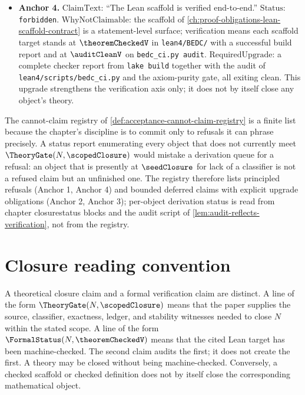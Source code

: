 \begin{remark}
\begin{itemize}
  \item \textbf{Anchor 4.} $\mathrm{ClaimText}$: ``The Lean scaffold is verified end-to-end.'' $\mathrm{Status}$: \texttt{forbidden}. $\mathrm{WhyNotClaimable}$: the scaffold of \autoref{ch:proof-obligations-lean-scaffold-contract} is a statement-level surface; verification means each scaffold target stands at $\theoremCheckedV$ in \texttt{lean4/BEDC/} with a successful build report and at $\auditCleanV$ on \texttt{bedc\_ci.py audit}. $\mathrm{RequiredUpgrade}$: a complete checker report from \texttt{lake build} together with the audit of \texttt{lean4/scripts/bedc\_ci.py} and the axiom-purity gate, all exiting clean. This upgrade strengthens the verification axis only; it does not by itself close any object's theory.
\end{itemize}
\end{remark}

\begin{remark}
\label{rem:acceptance-registry-finite}
The cannot-claim registry of \autoref{def:acceptance-cannot-claim-registry} is a finite list because the chapter's discipline is to commit only to refusals it can phrase precisely. A status report enumerating every object that does not currently meet $\TheoryGate(N, \scopedClosure)$ would mistake a derivation queue for a refusal: an object that is presently at $\seedClosure$ for lack of a classifier is not a refused claim but an unfinished one. The registry therefore lists principled refusals (Anchor 1, Anchor 4) and bounded deferred claims with explicit upgrade obligations (Anchor 2, Anchor 3); per-object derivation status is read from chapter closurestatus blocks and the audit script of \autoref{lem:audit-reflects-verification}, not from the registry.
\end{remark}

\section{Closure reading convention}
\label{sec:closure-reading-convention}

\begin{remark}
\label{rem:closure-reading-convention}
A theoretical closure claim and a formal verification claim are distinct. A line of the form $\TheoryGate(N, \scopedClosure)$ means that the paper supplies the source, classifier, exactness, ledger, and stability witnesses needed to close $N$ within the stated scope. A line of the form $\FormalStatus(N, \theoremCheckedV)$ means that the cited Lean target has been machine-checked. The second claim audits the first; it does not create the first. A theory may be closed without being machine-checked. Conversely, a checked scaffold or checked definition does not by itself close the corresponding mathematical object.
\end{remark}

